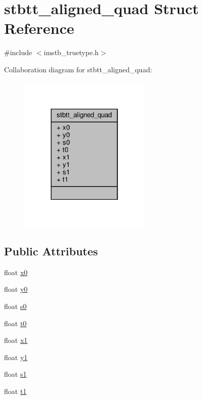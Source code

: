 \hypertarget{structstbtt__aligned__quad}{}\section{stbtt\+\_\+aligned\+\_\+quad Struct Reference}
\label{structstbtt__aligned__quad}


{\ttfamily \#include $<$imstb\+\_\+truetype.\+h$>$}



Collaboration diagram for stbtt\+\_\+aligned\+\_\+quad\+:
\nopagebreak
\begin{figure}[H]
\begin{center}
\leavevmode
\includegraphics[width=178pt]{structstbtt__aligned__quad__coll__graph}
\end{center}
\end{figure}
\subsection*{Public Attributes}
\begin{DoxyCompactItemize}
\item 
float \hyperlink{structstbtt__aligned__quad_ad74fd8fd69f8a8e1bd20cb0ab7df6e2e}{x0}
\item 
float \hyperlink{structstbtt__aligned__quad_a6178a6b380cf6889893afaeb5019ecd6}{y0}
\item 
float \hyperlink{structstbtt__aligned__quad_ac23b153ff4042deb5499e5a8cacf4a59}{s0}
\item 
float \hyperlink{structstbtt__aligned__quad_a921cd13638a8b3a1e0729021d371da49}{t0}
\item 
float \hyperlink{structstbtt__aligned__quad_a43a7eeac24238e289f825e644331dee6}{x1}
\item 
float \hyperlink{structstbtt__aligned__quad_a66ee8061da982804073a3d2a9114e53c}{y1}
\item 
float \hyperlink{structstbtt__aligned__quad_a26360efee3cdfb5aa2bdc593157b436b}{s1}
\item 
float \hyperlink{structstbtt__aligned__quad_ae1f5ed7333ca5bba46c6a098a05ac75b}{t1}
\end{DoxyCompactItemize}


